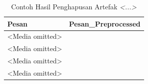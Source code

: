 \begingroup
\renewcommand{\arraystretch}{1}
\begin{table}[H]
\centering
\caption{Contoh Hasil Penghapusan Artefak \textit{<...>}}
\label{tab:remove-angle-bracket}
\scriptsize
\begin{tabular}{p{5cm} p{5cm}}
\toprule
\textbf{Pesan} & \textbf{Pesan\_Preprocessed} \\
\midrule
<Media omitted> &  \\
<Media omitted> &  \\
<Media omitted> &  \\
<Media omitted> &  \\
\bottomrule
\end{tabular}
\end{table}
\endgroup